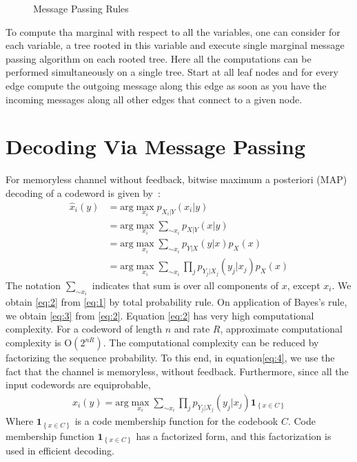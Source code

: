 \begin{figure}[htbp]
\begin{center}

\end{center}
\caption{Message Passing Rules \label{fig:rules}}
\end{figure}
To compute tha marginal with respect to all the variables, one can consider for each variable, a tree rooted in this variable and execute single marginal message passing algorithm 
on each rooted tree. Here all the computations can be performed simultaneously on a single tree. Start at all leaf nodes and for every edge compute the outgoing message along this
edge as soon as you have the incoming messages along all other edges that connect to a given node.
\section{Decoding Via Message Passing}
For memoryless channel without feedback, bitwise maximum a posteriori (MAP) decoding of a codeword is given by~\cite{mct}:  
\begin{align}
\hat x_i( y) &= \text{arg} \max_{x_i}p_{X_{i}|Y}(x_{i}| y) \label{eq:1}\\
\ &= \text{arg} \max_{x_i}\sum_{\sim x_i}p_{X|Y}( x| y) \label{eq:2}\\
\ &= \text{arg} \max_{x_i}\sum_{\sim x_i}p_{Y|X}( y| x)p_{X}( x) \label{eq:3}\\
\ &= \text{arg} \max_{x_i}\sum_{\sim x_i}\prod_{j}p_{Y_j|X_j}(y_j|x_j)p_{X}( x)\label{eq:4}
\end{align}
The notation $\sum_{\sim x_i}$ indicates that sum is over all components of $x$, except $x_i$. 
We obtain \eqref{eq:2} from \eqref{eq:1} by total probability rule. On application of Bayes's rule,
we obtain \eqref{eq:3} from \eqref{eq:2}.
Equation \eqref{eq:2} has very high computational complexity.
For a codeword of length $n$ and rate $R$, approximate computational complexity is $\mathrm{O} (2^{nR})$. 
The computational complexity can be reduced by factorizing the sequence probability. To this end, in equation\eqref{eq:4}, 
we use the fact that the channel is memoryless, without feedback. Furthermore, since all the input codewords are equiprobable,
\begin{align}
\hat x_i(y) = \text{arg} \max_{x_i}\sum_{\sim x_i}\prod_{j}p_{Y_j|X_j}(y_j|x_j)\mathbf{1}_{\left\lbrace x\in C\right\rbrace} \label{eq:5}
\end{align} 
Where $\mathbf{1}_{\left\lbrace x\in C\right\rbrace}$ is a code membership function for the codebook $C$. Code membership function $\mathbf{1}_{\left\lbrace x\in C\right\rbrace}$
has a factorized form, and this factorization is used in efficient decoding.

